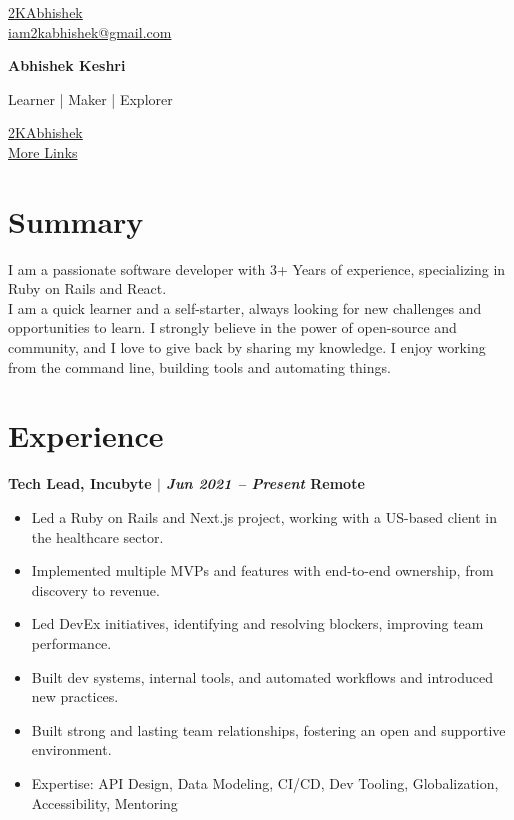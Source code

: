 \documentclass[11pt]{article} %
\newcommand{\uthree}[4]{
    {\large
        {\bfseries #1 $|$ \textit{#2} \hfill #3} \par
    }
    \begin{itemize}
        #4
    \end{itemize}
    \par\addvspace{2.5ex}%
}
\begin{document}
\begin{multicols}{3}
  \begin{flushleft}
    \color{gray}{\faGithub} \href{https://github.com/2kabhishek}{2KAbhishek} \\
    \color{gray}{\faEnvelope} \href{mailto:iam2kabhishek@gmail.com}{iam2kabhishek@gmail.com} \\
  \end{flushleft}

\columnbreak

  \begin{center}
      {\huge\bfseries Abhishek Keshri} \par
      Learner | Maker | Explorer \par
  \end{center}

\columnbreak

  \begin{flushright}
    \href{https://linkedin.com/in/2kabhishek/}{2KAbhishek} {\color{gray}{\faLinkedin}} \\
    \href{https://2kabhishek.github.io/links}{More Links} {\textcolor{gray}{\faLink}} \\
  \end{flushright}
\end{multicols}

\section{Summary}
I am a passionate software developer with 3+ Years of experience, specializing in Ruby on Rails and React. \\
I am a quick learner and a self-starter, always looking for new challenges and opportunities to learn.
I strongly believe in the power of open-source and community, and I love to give back by sharing my knowledge.
I enjoy working from the command line, building tools and automating things.

\section{Experience}
\uthree{Tech Lead, Incubyte}{Jun 2021 -- Present}{Remote}{
  \item Led a Ruby on Rails and Next.js project, working with a US-based client in the healthcare sector.
  \item Implemented multiple MVPs and features with end-to-end ownership, from discovery to revenue.
  \item Led DevEx initiatives, identifying and resolving blockers, improving team performance.
  \item Built dev systems, internal tools, and automated workflows and introduced new practices.
  \item Built strong and lasting team relationships, fostering an open and supportive environment.
  \item Expertise: API Design, Data Modeling, CI/CD, Dev Tooling, Globalization, Accessibility, Mentoring
}
\end{document}
